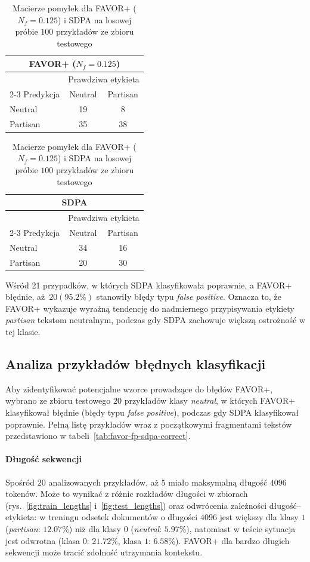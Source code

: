 \documentclass[a4paper,11pt,twoside]{report}
\theoremstyle{definition}
\begin{document}
\begin{table}[H]
\centering
\caption{Macierze pomyłek dla FAVOR+ ($N_f=0.125$) i SDPA na losowej próbie $100$ przykładów ze zbioru testowego}
\label{tab:confusion_comparison_qual}
\smallskip

\begin{tabular}{lcc}
\toprule
\multicolumn{3}{c}{\textbf{FAVOR+ ($N_f=0.125$)}} \\
\midrule
& \multicolumn{2}{c}{Prawdziwa etykieta} \\
\cmidrule(lr){2-3}
Predykcja & Neutral & Partisan \\
\midrule
Neutral & 19 & 8 \\
Partisan & 35 & 38 \\
\bottomrule
\end{tabular}
\hspace{1cm}
\begin{tabular}{lcc}
\toprule
\multicolumn{3}{c}{\textbf{SDPA}} \\
\midrule
& \multicolumn{2}{c}{Prawdziwa etykieta} \\
\cmidrule(lr){2-3}
Predykcja & Neutral & Partisan \\
\midrule
Neutral & 34 & 16 \\
Partisan & 20 & 30 \\
\bottomrule
\end{tabular}

\end{table}

Wśród 21 przypadków, w których SDPA klasyfikowała poprawnie, a FAVOR+ błędnie, aż~$20 (95.2\%)$ stanowiły błędy typu \textit{false positive}. Oznacza to, że FAVOR+ wykazuje wyraźną tendencję do nadmiernego przypisywania etykiety \textit{partisan} tekstom neutralnym, podczas gdy SDPA zachowuje większą ostrożność w tej klasie.

\subsection{Analiza przykładów błędnych klasyfikacji}

Aby zidentyfikować potencjalne wzorce prowadzące do błędów FAVOR+, wybrano ze zbioru testowego $20$ przykładów klasy \textit{neutral}, w których FAVOR+ klasyfikował błędnie (błędy typu \textit{false positive}), podczas gdy SDPA klasyfikował poprawnie. Pełną listę przykładów wraz z początkowymi fragmentami tekstów przedstawiono w tabeli~\ref{tab:favor-fp-sdpa-correct}.


\paragraph{Długość sekwencji}
Spośród $20$ analizowanych przykładów, aż $5$ miało maksymalną długość $4096$ tokenów. Może to wynikać z różnic rozkładów długości w zbiorach (rys.~\ref{fig:train_lengths} i~\ref{fig:test_lengths}) oraz odwrócenia zależności długość–etykieta: w treningu odsetek dokumentów o długości $4096$ jest większy dla klasy $1$ (\textit{partisan}: $12.07\%$) niż dla klasy $0$ (\textit{neutral}: $5.97\%$), natomiast w teście sytuacja jest odwrotna (klasa $0$: $21.72\%$, klasa $1$: $6.58\%$). FAVOR+ dla bardzo długich sekwencji może tracić zdolność utrzymania kontekstu.
\end{document}
